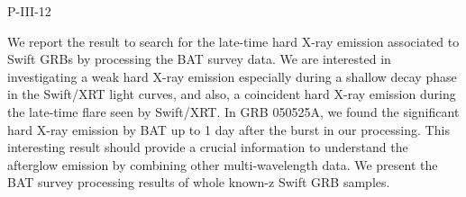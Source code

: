 P-III-12


\bigskip



\bigskip

\noindent We report the result to search for the late-time hard X-ray emission 
associated to Swift GRBs by processing the BAT survey data.  We are 
interested in investigating a weak hard X-ray emission especially during 
a shallow decay phase in the Swift/XRT light curves, and also, a coincident 
hard X-ray emission during the late-time flare seen by Swift/XRT.  In 
GRB 050525A, we found the significant hard X-ray emission by BAT up to 1 day 
after the burst in our processing.  This interesting result should provide 
a crucial information to understand the afterglow emission by combining 
other multi-wavelength data.  We present the BAT survey processing 
results of whole known-z Swift GRB samples.

